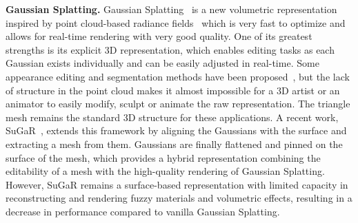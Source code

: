 \noindent
\textbf{Gaussian Splatting.} Gaussian Splatting~\cite{kerbl3Dgaussians} is a new volumetric representation inspired by point cloud-based radiance fields~\cite{kopanas2021point, ruckert2021adop} which is very fast to optimize and allows for real-time rendering with very good quality. One of its greatest strengths is its explicit 3D representation, which enables editing tasks as each Gaussian exists individually and can be easily adjusted in real-time. 
%
Some appearance editing and segmentation methods have been proposed~\cite{chen2023gaussianeditor,huang2023pointn,chungmin-2024-garfield,ye-2023-gaussian_grouping}, but the lack of structure in the point cloud makes it almost impossible for a 3D artist or an animator to easily modify, sculpt or animate the raw representation. The triangle mesh remains the standard 3D structure for these applications.
%
A recent work, SuGaR~\cite{guedon2023sugar}, extends this framework by aligning the Gaussians with the surface and extracting a mesh from them. Gaussians are finally flattened and pinned on the surface of the mesh, which provides a hybrid representation combining the editability of a mesh with the high-quality rendering of Gaussian Splatting. However, SuGaR remains a surface-based representation with limited capacity in reconstructing and rendering fuzzy materials and volumetric effects, resulting in a decrease in performance compared to vanilla Gaussian Splatting.